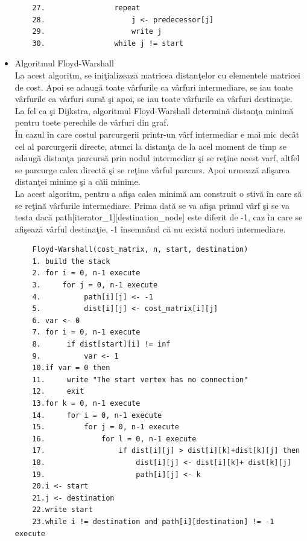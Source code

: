 \documentclass{article}
\begin{document}
\begin{itemize}
\begin{lstlisting}
    27.                repeat
    28.                    j <- predecessor[j]
    29.                    write j
    30.                while j != start
    \end{lstlisting}
    \item Algoritmul Floyd-Warshall\\
    La acest algoritm, se ini\c{t}ializeaz\u{a} matricea distan\c{t}elor cu elementele matricei de cost. Apoi se adaug\u{a} toate v\^{a}rfurile ca v\^{a}rfuri intermediare, se iau toate v\^{a}rfurile ca v\^{a}rfuri surs\u{a} \c{s}i apoi, se iau toate v\^{a}rfurile ca v\^{a}rfuri destina\c{t}ie. La fel ca \c{s}i Dijkstra, algoritmul Floyd-Warshall determin\u{a} distan\c{t}a minim\u{a} pentru toete perechile de v\^{a}rfuri din graf.\\
    \^{I}n cazul \^{i}n care costul parcurgerii printr-un v\^{a}rf intermediar e mai mic dec\^{a}t cel al parcurgerii directe, atunci la distan\c{t}a de la acel moment de timp se adaug\u{a} distan\c{t}a parcurs\u{a} prin nodul intermediar \c{s}i se re\c{t}ine acest varf, altfel se parcurge calea direct\u{a} \c{s}i se re\c{t}ine v\^{a}rful parcurs. Apoi urmeaz\u{a} afi\c{s}area distan\c{t}ei minime \c{s}i a c\u{a}ii minime.\\
    La acest algoritm, pentru a afi\c{s}a calea minim\u{a} am construit o stiv\u{a} \^{i}n care s\u{a} se re\c{t}in\u{a} v\^{a}rfurile intermediare. Prima dat\u{a} se va afi\c{s}a primul v\^{a}rf \c{s}i se va testa dac\u{a} path[iterator\_1][destination\_node] este diferit de -1, caz \^{i}n care se afi\c{s}eaz\u{a} v\^{a}rful destina\c{t}ie, -1 \^{i}nsemn\^{a}nd c\u{a} nu exist\u{a} noduri intermediare. 
    \begin{lstlisting}
    Floyd-Warshall(cost_matrix, n, start, destination)
    1. build the stack
    2. for i = 0, n-1 execute
    3.     for j = 0, n-1 execute
    4.          path[i][j] <- -1
    5.          dist[i][j] <- cost_matrix[i][j]
    6. var <- 0
    7. for i = 0, n-1 execute
    8.      if dist[start][i] != inf
    9.          var <- 1
    10.if var = 0 then
    11.     write "The start vertex has no connection"
    12.     exit
    13.for k = 0, n-1 execute
    14.     for i = 0, n-1 execute
    15.         for j = 0, n-1 execute
    16.             for l = 0, n-1 execute
    17.                 if dist[i][j] > dist[i][k]+dist[k][j] then
    18.                     dist[i][j] <- dist[i][k]+ dist[k][j]
    19.                     path[i][j] <- k
    20.i <- start
    21.j <- destination
    22.write start
    23.while i != destination and path[i][destination] != -1 execute

\end{lstlisting}
\end{itemize}
\end{document}
